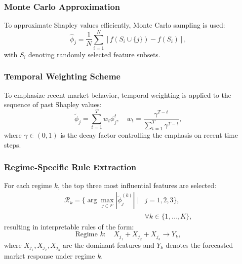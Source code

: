 \documentclass[conference,10pt]{IEEEtran}
\begin{document}
\subsubsection{Monte Carlo Approximation}
To approximate Shapley values efficiently, Monte Carlo sampling is used:
\begin{equation}
\hat{\phi}_j = \frac{1}{N} \sum_{i=1}^{N} \left[ f(S_i \cup \{j\}) - f(S_i) \right],
\end{equation}
with $S_i$ denoting randomly selected feature subsets.

\subsubsection{Temporal Weighting Scheme}

To emphasize recent market behavior, temporal weighting is applied to the sequence of past Shapley values:
\begin{equation}
\tilde{\phi}_j = \sum_{t=1}^{T} w_t \phi_j^t, \quad w_t = \frac{\gamma^{T-t}}{\sum_{t=1}^{T} \gamma^{T-t}},
\end{equation}
where $\gamma \in (0,1)$ is the decay factor controlling the emphasis on recent time steps.

\subsubsection{Regime-Specific Rule Extraction}
For each regime $k$, the top three most influential features are selected:
\begin{align}
\mathcal{R}_k = \Big\{ \arg\max_{j \in F} \left| \tilde{\phi}_j^{(k)} \right| \,\Big|\, & j=1,2,3 \Big\}, \nonumber \\
& \forall k \in \{1,\dots,K\},
\end{align}
resulting in interpretable rules of the form:
\begin{equation}
\text{Regime } k: \quad X_{j_1} + X_{j_2} + X_{j_3} \rightarrow Y_k,
\end{equation}
where $X_{j_1}, X_{j_2}, X_{j_3}$ are the dominant features and $Y_k$ denotes the forecasted market response under regime $k$.
\end{document}
